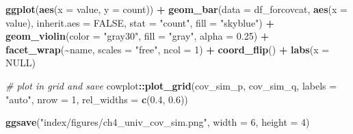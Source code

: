 \documentclass[12pt, twoside]{amherstthesis}
\newenvironment{Shaded}{\begin{snugshade}}{\end{snugshade}}
\newcommand{\AttributeTok}[1]{\textcolor[rgb]{0.13,0.29,0.53}{#1}}
\newcommand{\CommentTok}[1]{\textcolor[rgb]{0.56,0.35,0.01}{\textit{#1}}}
\newcommand{\ConstantTok}[1]{\textcolor[rgb]{0.56,0.35,0.01}{#1}}
\newcommand{\DecValTok}[1]{\textcolor[rgb]{0.00,0.00,0.81}{#1}}
\newcommand{\FloatTok}[1]{\textcolor[rgb]{0.00,0.00,0.81}{#1}}
\newcommand{\FunctionTok}[1]{\textcolor[rgb]{0.13,0.29,0.53}{\textbf{#1}}}
\newcommand{\NormalTok}[1]{#1}
\newcommand{\SpecialCharTok}[1]{\textcolor[rgb]{0.81,0.36,0.00}{\textbf{#1}}}
\newcommand{\StringTok}[1]{\textcolor[rgb]{0.31,0.60,0.02}{#1}}
\begin{document}
\begin{Shaded}
\begin{Highlighting}[]
  \FunctionTok{ggplot}\NormalTok{(}\FunctionTok{aes}\NormalTok{(}\AttributeTok{x =}\NormalTok{ value, }\AttributeTok{y =}\NormalTok{ count)) }\SpecialCharTok{+}
  \FunctionTok{geom\_bar}\NormalTok{(}\AttributeTok{data =}\NormalTok{ df\_forcovcat, }\FunctionTok{aes}\NormalTok{(}\AttributeTok{x =}\NormalTok{ value), }\AttributeTok{inherit.aes =} \ConstantTok{FALSE}\NormalTok{,}
           \AttributeTok{stat =} \StringTok{"count"}\NormalTok{, }\AttributeTok{fill =} \StringTok{"skyblue"}\NormalTok{) }\SpecialCharTok{+}
  \FunctionTok{geom\_violin}\NormalTok{(}\AttributeTok{color =} \StringTok{"gray30"}\NormalTok{, }\AttributeTok{fill =} \StringTok{"gray"}\NormalTok{, }\AttributeTok{alpha =} \FloatTok{0.25}\NormalTok{) }\SpecialCharTok{+} 
  \FunctionTok{facet\_wrap}\NormalTok{(}\SpecialCharTok{\textasciitilde{}}\NormalTok{name, }\AttributeTok{scales =} \StringTok{"free"}\NormalTok{, }\AttributeTok{ncol =} \DecValTok{1}\NormalTok{) }\SpecialCharTok{+}
  \FunctionTok{coord\_flip}\NormalTok{() }\SpecialCharTok{+}
  \FunctionTok{labs}\NormalTok{(}\AttributeTok{x =} \ConstantTok{NULL}\NormalTok{)}

\CommentTok{\# plot in grid and save}
\NormalTok{cowplot}\SpecialCharTok{::}\FunctionTok{plot\_grid}\NormalTok{(cov\_sim\_p, cov\_sim\_q, }\AttributeTok{labels =} \StringTok{"auto"}\NormalTok{, }\AttributeTok{nrow =} \DecValTok{1}\NormalTok{, }
                   \AttributeTok{rel\_widths =} \FunctionTok{c}\NormalTok{(}\FloatTok{0.4}\NormalTok{, }\FloatTok{0.6}\NormalTok{))}
  
\FunctionTok{ggsave}\NormalTok{(}\StringTok{"index/figures/ch4\_univ\_cov\_sim.png"}\NormalTok{, }\AttributeTok{width =} \DecValTok{6}\NormalTok{, }\AttributeTok{height =} \DecValTok{4}\NormalTok{)}
\end{Highlighting}
\end{Shaded}
\normalsize
\end{document}
